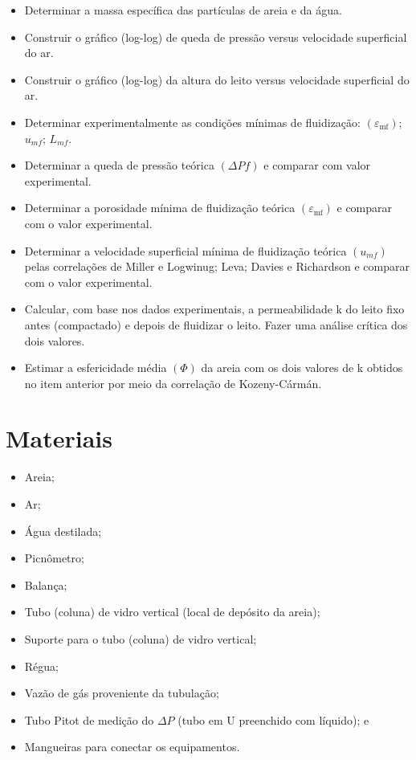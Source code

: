 \begin{itemize}
	\item Determinar a massa específica das partículas de areia e da água.
	\item Construir o gráfico (log-log) de queda de pressão versus velocidade superficial do ar.
	\item Construir o gráfico (log-log) da altura do leito versus velocidade superficial do ar.
	\item Determinar experimentalmente as condições mínimas de fluidização: $\left(\varepsilon_{\mathrm{mf}}\right)$; $ u_{mf} $; $ L_{mf} $.
	\item Determinar a queda de pressão teórica $ (\Delta Pf) $ e comparar com valor experimental.
	\item Determinar a porosidade mínima de fluidização teórica $\left(\varepsilon_{\mathrm{mf}}\right)$ e comparar com o valor experimental.
	\item Determinar a velocidade superficial mínima de fluidização teórica $ (u_{mf}) $ pelas correlações de Miller e Logwinug; Leva; Davies e Richardson e comparar com o valor experimental.
	\item Calcular, com base nos dados experimentais, a permeabilidade k do leito fixo antes (compactado) e depois de fluidizar o leito. Fazer uma análise crítica dos dois valores.
	\item Estimar a esfericidade média $ (\Phi) $ da areia com os dois valores de k obtidos no item anterior por meio da correlação de Kozeny-Cármán.
\end{itemize}


\chapter{Materiais}

\begin{itemize}
\item Areia;
\item Ar;
\item Água destilada;
\item Picnômetro;
\item Balança;
\item Tubo (coluna) de vidro vertical (local de depósito da areia);
\item Suporte para o tubo (coluna) de vidro vertical;
\item Régua;
\item Vazão de gás proveniente da tubulação;
\item Tubo Pitot de medição do $ \Delta P $ (tubo em U preenchido com líquido); e
\item Mangueiras para conectar os equipamentos.

\end{itemize}


